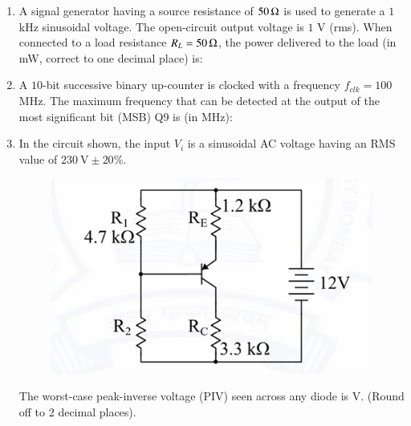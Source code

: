 \documentclass[journal,12pt,onecolumn]{IEEEtran}
\theoremstyle{remark}
\begin{document}
\begin{flushleft}
\begin{enumerate}
\item A signal generator having a source resistance of $50 \, \ohm$ is used to generate a $1$ kHz sinusoidal voltage.  
The open-circuit output voltage is $1$ V (rms). When connected to a load resistance $R_L = 50 \, \ohm$,  
the power delivered to the load (in mW, correct to one decimal place) is:  

\begin{enumerate}
\end{enumerate}


\item A $10$-bit successive binary up-counter is clocked with a frequency $f_{clk} = 100$ MHz.  
The maximum frequency that can be detected at the output of the most significant bit (MSB) Q9 is (in MHz):

\begin{enumerate}
\end{enumerate}

    \item In the circuit shown, the input $V_i$ is a sinusoidal AC voltage 
    having an RMS value of $230~\text{V} \pm 20\%$. 
    \begin{figure}[H]
        \centering
        \includegraphics[width=0.5\columnwidth]{figs/33.png}
        \caption{}
        \label{fig:placeholder}
    \end{figure}
    The worst-case peak-inverse voltage (PIV) seen across any diode is 
     V. (Round off to 2 decimal places).


\end{enumerate}
\end{flushleft}
\end{document}

